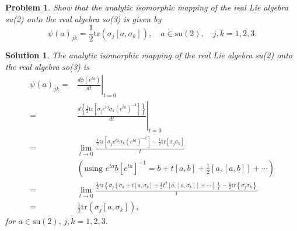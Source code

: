 \documentclass[UTF8,10pt,a4paper]{article}
\theoremstyle{Problem}
\newtheorem{prob}{Problem}
\theoremstyle{Solution}
\newtheorem*{sol}{Solution}
\begin{document}
\begin{prob}
    Show that the analytic isomorphic mapping of the real Lie algebra su(2) onto the real algebra so(3) is given by
    \[
        \psi(a)_{jk}=\frac{1}{2}\text{tr}(\sigma_j[a,\sigma_k]),\quad a\in\text{su}(2),\quad j,k=1,2,3.
    \]
\end{prob}
\begin{sol}
    The analytic isomorphic mapping of the real Lie algebra su(2) onto the real algebra so(3) is
    \begin{align}
        \nonumber\psi(a)_{jk}=&\left.\frac{d\phi(e^{ta})}{dt}\right\rvert_{t=0}\\
        \nonumber=&\left.\frac{d\left\{\frac{1}{2}\text{tr}[\sigma_je^{ta}\sigma_k(e^{ta})^{-1}]\right\}}{dt}\right\rvert_{t=0}\\
        \nonumber=&\lim_{t\rightarrow 0}\frac{\frac{1}{2}\text{tr}[\sigma_je^{ta}\sigma_k(e^{ta})^{-1}]-\frac{1}{2}\text{tr}[\sigma_j\sigma_k]}{t}\\
        \nonumber&(\text{using }e^{ta}b[e^{ta}]^{-1}=b+t[a,b]+\frac{1}{2}[a,[a,b]]+\cdots)\\
        \nonumber=&\lim_{t\rightarrow 0}\frac{\frac{1}{2}\text{tr}\left\{\sigma_j\left(\sigma_k+t[a,\sigma_k]+\frac{1}{2}t^2[a,[a,\sigma_k]]+\cdots\right)\right\}-\frac{1}{2}\text{tr}\left\{\sigma_j\sigma_k\right\}}{t}\\
        =&\frac{1}{2}\text{tr}(\sigma_j[a,\sigma_k]),
    \end{align}
    for $a\in\text{su}(2),\,j,k=1,2,3$.
\end{sol}
\end{document}
